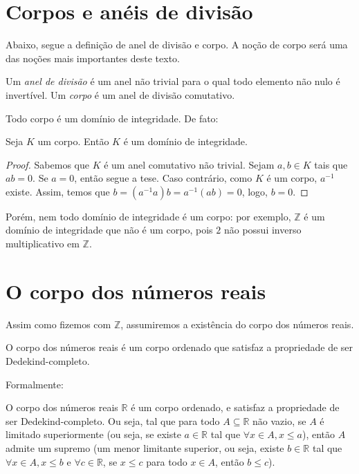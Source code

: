 \section{Corpos e anéis de divisão}

Abaixo, segue a definição de anel de divisão e corpo.
A noção de corpo será uma das noções mais importantes deste texto.
\begin{definition}
Um \emph{anel de divisão} é um anel não trivial para o qual todo elemento não nulo é invertível.
Um \emph{corpo} é um anel de divisão comutativo.
\end{definition}

Todo corpo é um domínio de integridade.
De fato:
\begin{prop}
    Seja $K$ um corpo.
    Então $K$ é um domínio de integridade.
\end{prop}
\begin{proof}
Sabemos que $K$ é um anel comutativo não trivial.
Sejam $a, b \in K$ tais que $ab=0$.
Se $a=0$, então segue a tese.
Caso contrário, como $K$ é um corpo, $a^{-1}$ existe.
Assim, temos que $b=(a^{-1}a)b=a^{-1}(ab)=0$, logo, $b=0$.
\end{proof}

Porém, nem todo domínio de integridade é um corpo: por exemplo, $\mathbb Z$ é um domínio de integridade que não é um corpo, pois $2$ não possui inverso multiplicativo em $\mathbb Z$.

\section{O corpo dos números reais}
Assim como fizemos com $\mathbb Z$, assumiremos a existência do corpo dos números reais.

O corpo dos números reais é um corpo ordenado que satisfaz a propriedade de ser Dedekind-completo.

Formalmente:

\begin{prop}
    O corpo dos números reais $\mathbb R$ é um corpo ordenado, e satisfaz a propriedade de ser Dedekind-completo.
    Ou seja, tal que para todo $A\subseteq \mathbb R$ não vazio, se $A$ é limitado superiormente (ou seja, se existe $a \in \mathbb R$ tal que $\forall x \in A, x\leq a$), então $A$ admite um supremo (um menor limitante superior, ou seja, existe $b \in \mathbb R$ tal que $\forall x \in A, x\leq b$ e $\forall c \in \mathbb R$, se $x\leq c$ para todo $x\in A$, então $b\leq c$).
\end{prop}

